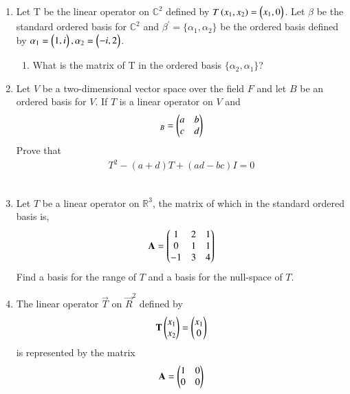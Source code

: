 \renewcommand{\theequation}{\theenumi}
\renewcommand{\thefigure}{\theenumi}
\begin{enumerate}[label=\thesubsection.\arabic*.,ref=\thesubsection.\theenumi]
%
\item Let T be the linear operator on $\mathbb{C}^{2}$ defined by $T\left(x_1 , x_2\right)=\begin{pmatrix}x_1 , 0\end{pmatrix}$.
Let $\beta$ be the standard ordered basis for $\mathbb{C}^{2}$ and $\beta^{'}=\{\alpha_1 , \alpha_2\}$
be the ordered basis defined by $\alpha_1 = \begin{pmatrix}1 , i\end{pmatrix} , \alpha_2 = \begin{pmatrix}-i , 2\end{pmatrix}$.
\begin{enumerate}
\item What is the matrix of T in the ordered basis $\{\alpha_2,\alpha_1\}$?
%
%
\\
\solution

\end{enumerate}
%
\item Let $V$ be a two-dimensional vector space over the field $F$ and let $B$ be an ordered basis for $V$. If $T$ is a linear operator on $V$ and 
\begin{align}
[T]_B = \myvec{a & b\\c & d}
\end{align}
Prove that 
\begin{align}
T^2 - (a+d)T + (ad-bc)I = 0
\end{align}
%
\\
\solution

\item Let $T$ be a linear operator on $\mathbb{R}^3$, the matrix of which in the standard ordered basis is,
\begin{align}
\mathbf{A} = \begin{pmatrix}1&2&1\\0&1&1\\-1&3&4\end{pmatrix} 
\end{align}
Find a basis for the range of $T$ and a basis for the null-space of $T$.
%
\\
\solution

\item The linear operator $\vec{T}$ on $\vec{R}^2$ defined by 
\begin{align}
	\mathbf{T}\begin{pmatrix}x_1\\x_2\end{pmatrix}=\begin{pmatrix}x_1\\0\end{pmatrix}
\end{align}
is represented by the matrix
\begin{align}
	\mathbf{A}=\begin{pmatrix}1&0\\
		       0&0\end{pmatrix}
\end{align}

\end{enumerate}
